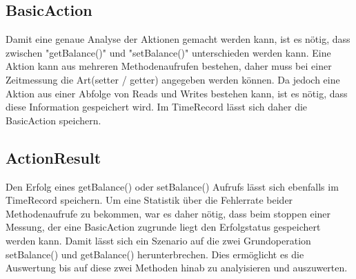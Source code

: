\subsection{BasicAction}
\label{sec:BasicAction}
Damit eine genaue Analyse der Aktionen ge\-macht werden kann, ist es nö\-tig, dass zwi\-schen "get\-Ba\-lan\-ce()" und "set\-Ba\-lan\-ce()" un\-ter\-schieden wer\-den kann. Eine Aktion kann aus mehreren Methoden\-auf\-rufen bestehen, daher muss bei einer Zeitmessung die Art(setter / getter) angegeben werden können. Da jedoch eine Aktion aus einer Abfolge von Reads und Writes bestehen kann, ist es nötig, dass diese Information gespeichert wird. Im TimeRecord lässt sich daher die BasicAction speichern.

\subsection{ActionResult}
\label{sec:ActionResult}
Den Erfolg eines getBalance() oder setBalance() Aufrufs lässt sich ebenfalls im TimeRecord speichern. Um eine Statistik über die Fehlerrate beider Methodenaufrufe zu bekommen, war es daher nötig, dass beim stoppen einer Messung, der eine BasicAction zugrunde liegt den Erfolgstatus gespeichert werden kann. Damit lässt sich ein Szenario auf die zwei Grundoperation setBalance() und getBalance() herunterbrechen. Dies ermöglicht es die Auswertung bis auf diese zwei Methoden hinab zu analyisieren und auszuwerten.

